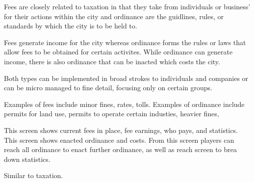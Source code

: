 Fees are closely related to taxation in that they take from individuals or business' for their actions within the city and ordinance are the guidlines, rules, or standards by which the city is to be held to.

Fees generate income for the city whereas ordinance forms the rules or laws that allow fees to be obtained for certain activites. While ordinance can generate income, there is also ordinance that can be inacted which costs the city.

Both types can be implemented in broad strokes to individuals and companies or can be micro managed to fine detail, focusing only on certain groups.

Examples of fees include minor fines, rates, tolls.
Examples of ordinance include permits for land use, permits to operate certain industies, heavier fines, 

This screen shows current fees in place, fee earnings, who pays, and statistics.
This screen shows enacted ordinance and costs. From this screen players can reach all ordinance to enact further ordinance, as well as reach screen to brea down statistics. 


Similar to taxation.

